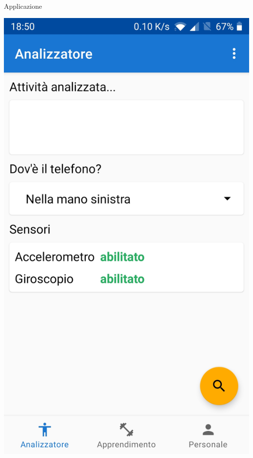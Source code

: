 \begin{tframe}{Applicazione}
\begin{minipage}{0.65\textwidth}
        \centering\includegraphics[scale = 0.06]{assets/images/screenshots/analisi.jpg}

\end{minipage}
\end{tframe}
